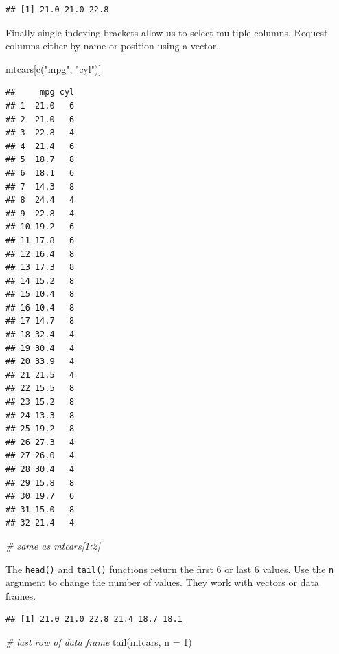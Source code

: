 \documentclass[
]{book}
\newenvironment{Shaded}{\begin{snugshade}}{\end{snugshade}}
\newcommand{\AttributeTok}[1]{\textcolor[rgb]{0.77,0.63,0.00}{#1}}
\newcommand{\CommentTok}[1]{\textcolor[rgb]{0.56,0.35,0.01}{\textit{#1}}}
\newcommand{\DecValTok}[1]{\textcolor[rgb]{0.00,0.00,0.81}{#1}}
\newcommand{\FunctionTok}[1]{\textcolor[rgb]{0.00,0.00,0.00}{#1}}
\newcommand{\NormalTok}[1]{#1}
\newcommand{\SpecialCharTok}[1]{\textcolor[rgb]{0.00,0.00,0.00}{#1}}
\newcommand{\StringTok}[1]{\textcolor[rgb]{0.31,0.60,0.02}{#1}}
\begin{document}
\begin{verbatim}
## [1] 21.0 21.0 22.8
\end{verbatim}

Finally single-indexing brackets allow us to select multiple columns. Request columns either by name or position using a vector.

\begin{Shaded}
\begin{Highlighting}[]
\NormalTok{mtcars[}\FunctionTok{c}\NormalTok{(}\StringTok{"mpg"}\NormalTok{, }\StringTok{"cyl"}\NormalTok{)] }
\end{Highlighting}
\end{Shaded}

\begin{verbatim}
##     mpg cyl
## 1  21.0   6
## 2  21.0   6
## 3  22.8   4
## 4  21.4   6
## 5  18.7   8
## 6  18.1   6
## 7  14.3   8
## 8  24.4   4
## 9  22.8   4
## 10 19.2   6
## 11 17.8   6
## 12 16.4   8
## 13 17.3   8
## 14 15.2   8
## 15 10.4   8
## 16 10.4   8
## 17 14.7   8
## 18 32.4   4
## 19 30.4   4
## 20 33.9   4
## 21 21.5   4
## 22 15.5   8
## 23 15.2   8
## 24 13.3   8
## 25 19.2   8
## 26 27.3   4
## 27 26.0   4
## 28 30.4   4
## 29 15.8   8
## 30 19.7   6
## 31 15.0   8
## 32 21.4   4
\end{verbatim}

\begin{Shaded}
\begin{Highlighting}[]
\CommentTok{\# same as mtcars[1:2] }
\end{Highlighting}
\end{Shaded}

The \texttt{head()} and \texttt{tail()} functions return the first 6 or last 6 values. Use the \texttt{n} argument to change the number of values. They work with vectors or data frames.

\begin{Shaded}
\end{Shaded}

\begin{verbatim}
## [1] 21.0 21.0 22.8 21.4 18.7 18.1
\end{verbatim}

\begin{Shaded}
\begin{Highlighting}[]
\CommentTok{\# last row of data frame}
\FunctionTok{tail}\NormalTok{(mtcars, }\AttributeTok{n =} \DecValTok{1}\NormalTok{)}
\end{Highlighting}
\end{Shaded}
\end{document}
